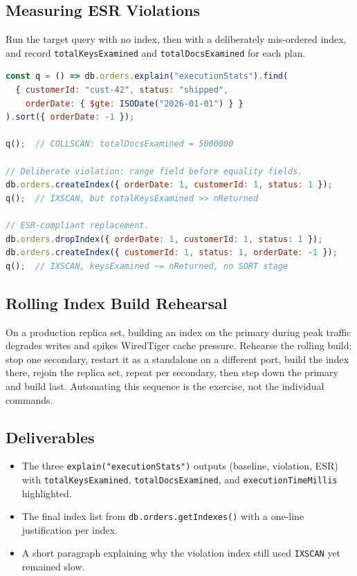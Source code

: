 \subsection{Measuring ESR Violations}
Run the target query with no index, then with a deliberately mis-ordered index, and record \texttt{totalKeysExamined} and \texttt{totalDocsExamined} for each plan.

\begin{lstlisting}[language=JavaScript, caption={Baseline, ESR violation, and corrected index.}]
const q = () => db.orders.explain("executionStats").find(
  { customerId: "cust-42", status: "shipped",
    orderDate: { $gte: ISODate("2026-01-01") } }
).sort({ orderDate: -1 });

q();  // COLLSCAN: totalDocsExamined = 5000000

// Deliberate violation: range field before equality fields.
db.orders.createIndex({ orderDate: 1, customerId: 1, status: 1 });
q();  // IXSCAN, but totalKeysExamined >> nReturned

// ESR-compliant replacement.
db.orders.dropIndex({ orderDate: 1, customerId: 1, status: 1 });
db.orders.createIndex({ customerId: 1, status: 1, orderDate: -1 });
q();  // IXSCAN, keysExamined ~= nReturned, no SORT stage
\end{lstlisting}

\subsection{Rolling Index Build Rehearsal}
On a production replica set, building an index on the primary during peak traffic degrades writes and spikes WiredTiger cache pressure. Rehearse the rolling build: stop one secondary, restart it as a standalone on a different port, build the index there, rejoin the replica set, repeat per secondary, then step down the primary and build last. Automating this sequence is the exercise, not the individual commands.

\subsection*{Deliverables}
\begin{itemize}
    \item The three \texttt{explain("executionStats")} outputs (baseline, violation, ESR) with \texttt{totalKeysExamined}, \texttt{totalDocsExamined}, and \texttt{executionTimeMillis} highlighted.
    \item The final index list from \texttt{db.orders.getIndexes()} with a one-line justification per index.
    \item A short paragraph explaining why the violation index still used \texttt{IXSCAN} yet remained slow.
\end{itemize}

